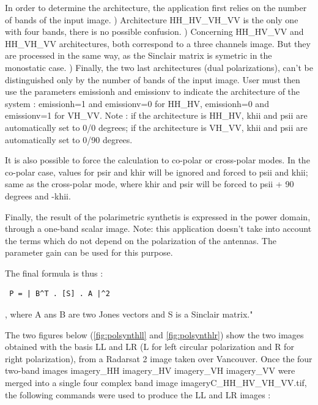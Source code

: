 {In order to determine the architecture, the application first relies on the number of bands of the input image. ) Architecture HH\_HV\_VH\_VV is the only one with four bands, there is no possible confusion. ) Concerning HH\_HV\_VV and HH\_VH\_VV architectures, both correspond to a three channels image. But they are processed in the same way, as the Sinclair matrix is symetric in the monostatic case. ) Finally, the two last architectures (dual polarizations), can't be distinguished only by the number of bands of the input image. User must then use the parameters emissionh and emissionv to indicate the architecture of the system : emissionh=1 and emissionv=0 for HH\_HV,  emissionh=0 and emissionv=1 for VH\_VV. \newline
Note : if the architecture is HH\_HV, khii and psii are automatically set to 0/0 degrees; if the architecture is VH\_VV, khii and psii are automatically set to 0/90 degrees.

It is also possible to force the calculation to co-polar or cross-polar modes.
In the co-polar case, values for psir and khir will be ignored and forced to psii and khii; same as the cross-polar mode, where khir and psir will be forced to psii + 90 degrees and -khii.

Finally, the result of the polarimetric synthetis is expressed in the power domain, through a one-band scalar image. \newline
Note: this application doesn't take into account the terms which do not depend on the polarization of the antennas. 
The parameter gain can be used for this purpose. \newline

 
The final formula is thus : \begin{verbatim} P = | B^T . [S] . A |^2 \end{verbatim}, where A ans B are two Jones vectors and S is a Sinclair matrix."

 \newline
 
The two figures below (\ref{fig:polsynthll} and \ref{fig:polsynthlr}) show the two images obtained with the basis LL and LR (L for left circular polarization and R for right polarization),
from a Radarsat 2 image taken over Vancouver. Once the four two-band images imagery\_HH imagery\_HV imagery\_VH imagery\_VV were merged 
into a single four complex band image imageryC\_HH\_HV\_VH\_VV.tif, the following commands were used to produce the LL and LR images :

}
